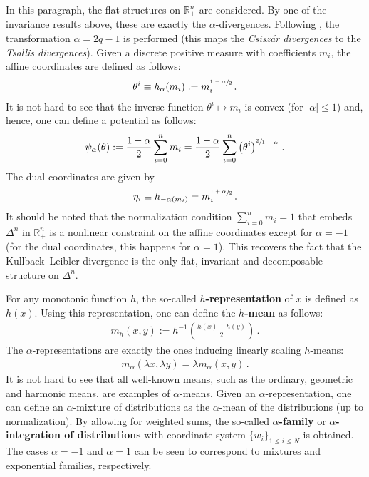     In this paragraph, the flat structures on $\mathbb{R}^n_+$ are considered. By one of the invariance results above, these are exactly the $\alpha$-divergences. Following , the transformation $\alpha=2q-1$ is performed (this maps the \textit{Csisz\'ar divergences} to the \textit{Tsallis divergences}). Given a discrete positive measure with coefficients $m_i$, the affine coordinates are defined as follows:
    \begin{gather}
        \theta^i \equiv h_\alpha(m_i) := m_i^{\sfrac{1-\alpha}{2}}\,.
    \end{gather}
    It is not hard to see that the inverse function $\theta^i\mapsto m_i$ is convex (for $|\alpha|\leq1$) and, hence, one can define a potential as follows:
    \begin{gather}
        \psi_\alpha(\theta) := \frac{1-\alpha}{2}\sum_{i=0}^n m_i = \frac{1-\alpha}{2}\sum_{i=0}^n \left(\theta^i\right)^{\sfrac{2}{1-\alpha}}\,.
    \end{gather}
    The dual coordinates are given by
    \begin{gather}
        \eta_i \equiv h_{-\alpha(m_i)} = m_i^{\sfrac{1+\alpha}{2}}\,.
    \end{gather}
    It should be noted that the normalization condition $\sum_{i=0}^nm_i=1$ that embeds $\Delta^n$ in $\mathbb{R}^n_+$ is a nonlinear constraint on the affine coordinates except for $\alpha=-1$ (for the dual coordinates, this happens for $\alpha=1$). This recovers the fact that the Kullback--Leibler divergence is the only flat, invariant and decomposable structure on $\Delta^n$.

    For any monotonic function $h$, the so-called \textbf{$h$-representation} of $x$ is defined as $h(x)$. Using this representation, one can define the \textbf{$h$-mean} as follows:
    \begin{gather}
        m_h(x,y) := h^{-1}\left(\frac{h(x)+h(y)}{2}\right)\,.
    \end{gather}
    The $\alpha$-representations are exactly the ones inducing linearly scaling $h$-means:
    \begin{gather}
        m_\alpha(\lambda x,\lambda y) = \lambda m_\alpha(x,y)\,.
    \end{gather}
    It is not hard to see that all well-known means, such as the ordinary, geometric and harmonic means, are examples of $\alpha$-means. Given an $\alpha$-representation, one can define an $\alpha$-mixture of distributions as the $\alpha$-mean of the distributions (up to normalization). By allowing for weighted sums, the so-called \textbf{$\alpha$-family} or \textbf{$\alpha$-integration of distributions} with coordinate system $\{w_i\}_{1\leq i\leq N}$ is obtained. The cases $\alpha=-1$ and $\alpha=1$ can be seen to correspond to mixtures and exponential families, respectively.

